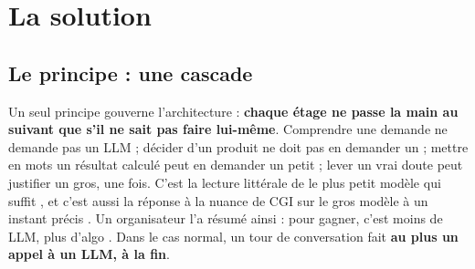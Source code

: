 \chapter{La solution}
\label{ch:solution}

\section{Le principe : une cascade}

Un seul principe gouverne l'architecture : \textbf{chaque étage ne passe la main au suivant que
s'il ne sait pas faire lui-même}. Comprendre une demande ne demande pas un LLM ; décider d'un
produit ne doit pas en demander un ; mettre en mots un résultat calculé peut en demander un petit ;
lever un vrai doute peut justifier un gros, une fois. C'est la lecture littérale de \og le plus
petit modèle qui suffit \fg, et c'est aussi la réponse à la nuance de CGI sur le \og gros modèle à
un instant précis \fg. Un organisateur l'a résumé ainsi : \og pour gagner, c'est moins de LLM,
plus d'algo \fg. Dans le cas normal, un tour de conversation fait \textbf{au plus un appel à un
LLM, à la fin}.


